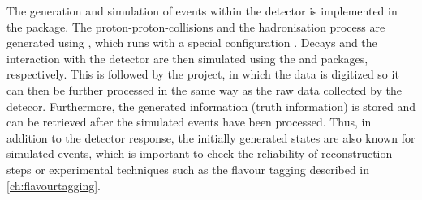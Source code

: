 The generation and simulation of events within the \lhcb detector is implemented in the \gauss package.
The proton-proton-collisions and the hadronisation process are generated using \pythia \cite{pythia6, pythia8}, which runs with a special \lhcb configuration \cite{LHCb-PROC-2010-056}.
Decays and the interaction with the detector are then simulated using the \evtgen \cite{evtgen} and \geant \cite{geant1, geant2} packages, respectively.
This is followed by the \boole project, in which the data is digitized so it can then be further processed in the same way as the raw data collected by the detecor.
Furthermore, the generated information (truth information) is stored and can be retrieved after the simulated events have been processed.
Thus, in addition to the detector response, the initially generated states are also known for simulated events, which is important to check the reliability of reconstruction steps or experimental techniques such as the flavour tagging described in \cref{ch:flavourtagging}.
